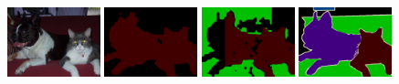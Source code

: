 \begin{figure}[tbhp!]
  {\includegraphics[width=0.24\textwidth]{figures/experiments/pascal/orgckpt/0059.jpg}}
  {\includegraphics[width=0.24\textwidth]{figures/experiments/pascal/orgckpt/0059.png}}
  {\includegraphics[width=0.24\textwidth]{figures/experiments/pascal/nonnoisybaseline/0059.png}}
  {\includegraphics[width=0.24\textwidth]{figures/experiments/pascal/gt/2007_001763.png}}
  

\end{figure}
